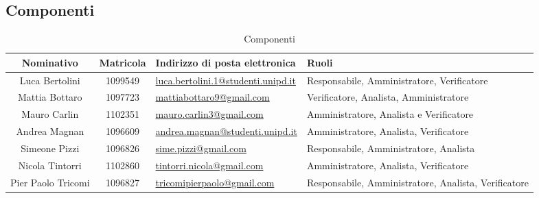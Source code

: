 \documentclass[a4paper,titlepage]{article}
\begin{document}
\subsection{Componenti}
\begin{table}[H]
	\begin{center}
		\setlength{\extrarowheight}{\jot}
		\begin{tabular}{|c|c|p{5cm}|p{4.3cm}|}
			\hline
			\textbf{Nominativo} & \textbf{Matricola} & \raggedright \textbf{Indirizzo di posta elettronica} & \textbf{Ruoli} \\[1ex]
			\hline
	 		Luca Bertolini & 1099549 & \href{mailto:luca.bertolini.1@studenti.unipd.it}{luca.bertolini.1@studenti.unipd.it} & Responsabile, Amministratore, Verificatore \\[1ex]
			\hline
			Mattia Bottaro & 1097723	& \href{mailto:mattiabottaro9@gmail.com}{mattiabottaro9@gmail.com} & Verificatore, Analista, Amministratore  \\[1ex]
			\hline
			Mauro Carlin & 1102351	& \href{mailto:indirizzo@ema.il}{mauro.carlin3@gmail.com} & Amministratore, Analista e Verificatore	\\[1ex]
			\hline
			Andrea Magnan & 1096609 & \href{mailto:andrea.magnan@studenti.unipd.it}{andrea.magnan@studenti.unipd.it} & Amministratore, Analista, Verificatore\\[1ex]
			\hline
			Simeone Pizzi & 1096826	& \href{mailto:sime.pizzi@gmail.com}{sime.pizzi@gmail.com} 	& Responsabile, Amministratore, Analista \\[1ex]
			\hline
			Nicola Tintorri	& 1102860 & \href{mailto:tintorri.nicola@gmail.com}{tintorri.nicola@gmail.com} & Amministratore, Analista, Verificatore 	\\[1ex]
			\hline
			Pier Paolo Tricomi	& 1096827	& \href{mailto:tricomipierpaolo@gmail.com}{tricomipierpaolo@gmail.com} & Responsabile, Amministratore, Analista, Verificatore \\[1ex]
			\hline	
		\end{tabular}
	\end{center}
	\caption{Componenti}
\end{table}
\end{document}
